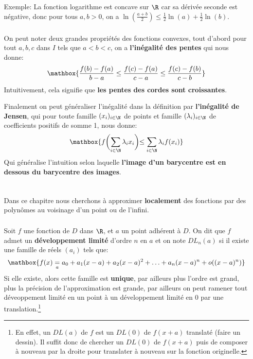 Exemple:  La fonction logarithme est concave sur \(\R\) car sa dérivée seconde est négative, donc pour tous \(a, b > 0\), on a \(\ln(\frac{a + b}{2}) \leq \frac{1}{2}\ln(a) + \frac{1}{2}\ln(b)\).
\subsection*{}
On peut noter deux grandes propriétés des fonctions convexes, tout d'abord pour tout \(a, b, c\) dans \(I\) tels que \(a < b < c\), on a \textbf{l'inégalité des pentes} qui nous donne:
\[
   \mathbox{\frac{f(b)-f(a)}{b-a} \leq \frac{f(c)-f(a)}{c-a} \leq \frac{f(c)-f(b)}{c-b}}   
\]
Intuitivement, cela signifie que \textbf{les pentes des cordes sont croissantes}.\<

Finalement on peut généraliser l'inégalité dans la définition par \textbf{l'inégalité de Jensen}, qui pour toute famille \((x_i)_{i \in \N}\) de points et famille \((\lambda_i)_{i \in \N}\) de coefficients positifs de somme 1, nous donne:
\[
   \mathbox{f\biggl(\sum_{i \in \N} \lambda_i x_i\biggl) \leq  \sum_{i \in \N} \lambda_i f(x_i)}
\]
Qui généralise l'intuition selon laquelle \textbf{l'image d'un barycentre est en dessous du barycentre des images}.

\chapter*{}
Dans ce chapitre nous cherchons à approximer \textbf{localement} des fonctions par des polynômes au voisinage d'un point ou de l'infini.
\subsection*{}
Soit \(f\) une fonction de \(D\) dans \(\R\), et \(a\) un point adhérent à \(D\). On dit que \(f\) admet un \textbf{développement limité} d'ordre \(n\) en \(a\) et on note \(DL_n(a)\) si il existe une famille de réels \((a_i)\) tels que:
\[
   \mathbox{f(x) \underset{a}{=} a_0 + a_1(x-a) + a_2(x-a)^2 + \ldots + a_n(x-a)^n + o((x-a)^n)}   
\]
Si elle existe, alors cette famille est \textbf{unique}, par ailleurs plus l'ordre est grand, plus la précision de l'approximation est grande, par ailleurs on peut ramener tout déveoppement limité en un point à un développement limité en \(0\) par une translation.\footnote[1]{En effet, un \(DL(a)\) de \(f\) est un \(DL(0)\) de \(f(x + a)\) translaté (faire un dessin). Il suffit donc de chercher un \(DL(0)\) de \(f(x + a)\) puis de composer à nouveau par la droite pour translater à nouveau sur la fonction originelle.}\<

